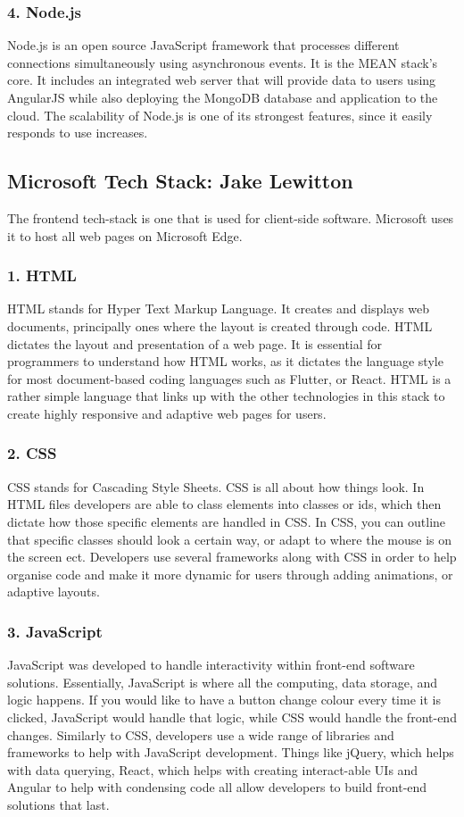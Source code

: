 \documentclass[a4paper, 11pt]{report}
\begin{document}
\subsubsection{4. Node.js}
Node.js is an open source JavaScript framework that processes different connections simultaneously using asynchronous events.\cite{isaac8}  It is the MEAN stack's core. It includes an integrated web server that will provide data to users using AngularJS while also deploying the MongoDB database and application to the cloud.\cite{isaac8} The scalability of Node.js is one of its strongest features, since it easily responds to use increases.

\subsection{Microsoft Tech Stack: Jake Lewitton}

The frontend tech-stack is one that is used for client-side software. Microsoft uses it to host all web pages on Microsoft Edge.

\subsubsection{1. HTML}
HTML stands for Hyper Text Markup Language. It creates and displays web documents, principally ones where the layout is created through code. HTML dictates the layout and presentation of a web page. It is essential for programmers to understand how HTML works, as it dictates the language style for most document-based coding languages such as Flutter, or React. HTML is a rather simple language that links up with the other technologies in this stack to create highly responsive and adaptive web pages for users.
\subsubsection{2. CSS}
CSS stands for Cascading Style Sheets. CSS is all about how things look. In HTML files developers are able to class elements into classes or ids, which then dictate how those specific elements are handled in CSS. In CSS, you can outline that specific classes should look a certain way, or adapt to where the mouse is on the screen ect.
Developers use several frameworks along with CSS in order to help organise code and make it more dynamic for users through adding animations, or adaptive layouts.
\subsubsection{3. JavaScript}
JavaScript was developed to handle interactivity within front-end software solutions. Essentially, JavaScript is where all the computing, data storage, and logic happens. If you would like to have a button change colour every time it is clicked, JavaScript would handle that logic, while CSS would handle the front-end changes. Similarly to CSS, developers use a wide range of libraries and frameworks to help with JavaScript development. Things like jQuery, which helps with data querying, React, which helps with creating interact-able UIs and Angular to help with condensing code all allow developers to build front-end solutions that last.
\end{document}
